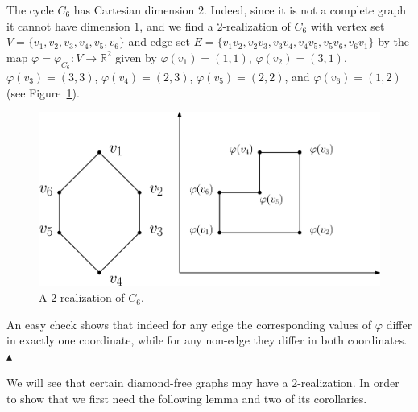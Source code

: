 \documentclass[12pt,a4paper,titlepage,openany]{report}
\begin{document}
\begin{example}
The cycle $C_6$ has Cartesian dimension $2$. Indeed, since it is not a complete graph it cannot have dimension $1$, and we find a $2$-realization of $C_6$ with vertex set $V=\{v_1,v_2,v_3,v_4,v_5,v_6\}$ and edge set $E=\{v_1v_2,v_2v_3,v_3v_4,v_4v_5,v_5v_6,v_6v_1\}$ by the map $\varphi = \varphi_{C_6}:V\to \mathbb{R}^2$ given by $\varphi(v_1)=(1,1)$, $\varphi(v_2)=(3,1)$, $\varphi(v_3)=(3,3)$, $\varphi(v_4)=(2,3)$, $\varphi(v_5)=(2,2)$, and $\varphi(v_6)=(1,2)$ (see Figure~\ref{c_62real}).

\begin{figure}[h]
\begin{center}
\includegraphics[width=0.8\linewidth]{figures/c_62real.png}
\end{center}
\caption{A $2$-realization of $C_6$.}\label{c_62real}
\end{figure}

An easy check shows that indeed for any edge the corresponding values of $\varphi$ differ in exactly one coordinate, while for any non-edge they differ in both coordinates.
\hfill$\blacktriangle$
\end{example}

We will see that certain diamond-free graphs may have a $2$-realization. In order to show that we first need the following lemma and two of its corollaries.

%
\end{document}
